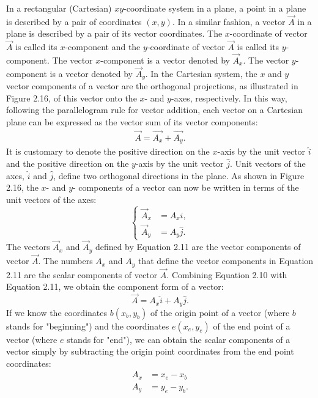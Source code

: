 \documentclass{report}
\begin{document}
    \bigbreak \noindent 




    
    





    \pagebreak 
    \bigbreak \noindent 
    In a rectangular (Cartesian) $xy$-coordinate system in a plane, a point in a plane is described by a pair of coordinates $(x, y)$. In a similar fashion, a vector $\vec{A}$ in a plane is described by a pair of its vector coordinates. The $x$-coordinate of vector $\vec{A}$ is called its $x$-component and the $y$-coordinate of vector $\vec{A}$ is called its $y$-component. The vector $x$-component is a vector denoted by $\vec{A}_x$. The vector $y$-component is a vector denoted by $\vec{A}_y$. In the Cartesian system, the $x$ and $y$ vector components of a vector are the orthogonal projections, as illustrated in Figure 2.16, of this vector onto the $x$- and $y$-axes, respectively. In this way, following the parallelogram rule for vector addition, each vector on a Cartesian plane can be expressed as the vector sum of its vector components:
    \begin{align*}
        \vec{A} = \vec{A_{x}} + \vec{A_{y}}
    .\end{align*}
    \bigbreak \noindent 
    \bigbreak \noindent 
    It is customary to denote the positive direction on the $x$-axis by the unit vector $\hat{i}$ and the positive direction on the $y$-axis by the unit vector $\hat{j}$. Unit vectors of the axes, $\hat{i}$ and $\hat{j}$, define two orthogonal directions in the plane. As shown in Figure 2.16, the $x$- and $y$- components of a vector can now be written in terms of the unit vectors of the axes:
       \begin{equation}
            \begin{cases}
                \vec{A}_x &= A_x \hat{i}, \\
                \vec{A}_y &= A_y \hat{j}.
            \end{cases}
        \end{equation}
    \bigbreak \noindent 
    The vectors $\vec{A}_x$ and $\vec{A}_y$ defined by Equation 2.11 are the vector components of vector $\vec{A}$. The numbers $A_x$ and $A_y$ that define the vector components in Equation 2.11 are the scalar components of vector $\vec{A}$. Combining Equation 2.10 with Equation 2.11, we obtain the component form of a vector:
    \[
        \vec{A} = A_x \hat{i} + A_y \hat{j}.
    \]
    \bigbreak \noindent 
    If we know the coordinates $b(x_b, y_b)$ of the origin point of a vector (where $b$ stands for "beginning") and the coordinates $e(x_e, y_e)$ of the end point of a vector (where $e$ stands for "end"), we can obtain the scalar components of a vector simply by subtracting the origin point coordinates from the end point coordinates:
    \begin{align*}
        A_x &= x_e - x_b  \\
        A_y &= y_e - y_b
    .\end{align*}
\end{document}
